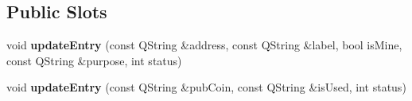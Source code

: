 \subsection*{Public Slots}
\begin{DoxyCompactItemize}
\item 
\mbox{\label{class_address_table_model_aa2f39463431a15741ed4d78ef592dfe5}} 
void {\bfseries update\+Entry} (const Q\+String \&address, const Q\+String \&label, bool is\+Mine, const Q\+String \&purpose, int status)
\item 
\mbox{\label{class_address_table_model_a5db651a0f7bbb52954c4a735c5dddb77}} 
void {\bfseries update\+Entry} (const Q\+String \&pub\+Coin, const Q\+String \&is\+Used, int status)
\end{DoxyCompactItemize}
